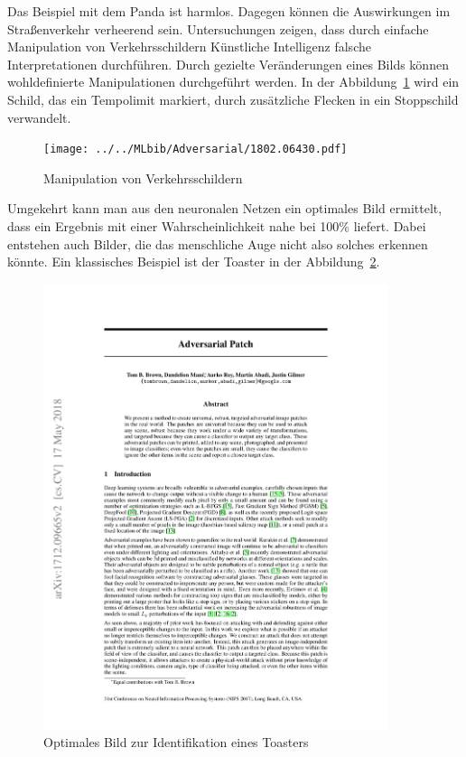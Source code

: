 Das Beispiel mit dem Panda ist harmlos. Dagegen können die Auswirkungen im Straßenverkehr verheerend sein. Untersuchungen zeigen, dass durch einfache Manipulation von Verkehrsschildern Künstliche Intelligenz falsche Interpretationen durchführen. \cite{Sitawarin:2018} Durch gezielte Veränderungen eines Bilds können wohldefinierte Manipulationen durchgeführt werden. In der Abbildung~\ref{Adversarial:Stop} wird ein Schild, das ein Tempolimit markiert, durch zusätzliche Flecken in ein Stoppschild verwandelt. 



\begin{figure}
  \centering
  \texttt{[image: ../../MLbib/Adversarial/1802.06430.pdf]}
    
  \caption{Manipulation von Verkehrsschildern  \cite{Sitawarin:2018}}\label{Adversarial:Stop}
\end{figure}

Umgekehrt kann man aus den neuronalen Netzen ein optimales Bild ermittelt, dass ein Ergebnis mit einer Wahrscheinlichkeit nahe bei 100\% liefert. Dabei entstehen auch Bilder, die das menschliche Auge nicht also solches erkennen könnte. Ein klassisches Beispiel ist der Toaster in der Abbildung~\ref{Adversarial:Toaster}.\cite{Brown:2017}


\begin{figure}
    \includegraphics[page=2,width=0.9\textwidth,viewport=20 470 560 900,clip]{../../MLbib/Adversarial/1712.09665.pdf}
    
    \caption{Optimales Bild zur Identifikation eines Toasters  \cite{Sitawarin:2018}}\label{Adversarial:Toaster}
\end{figure}

